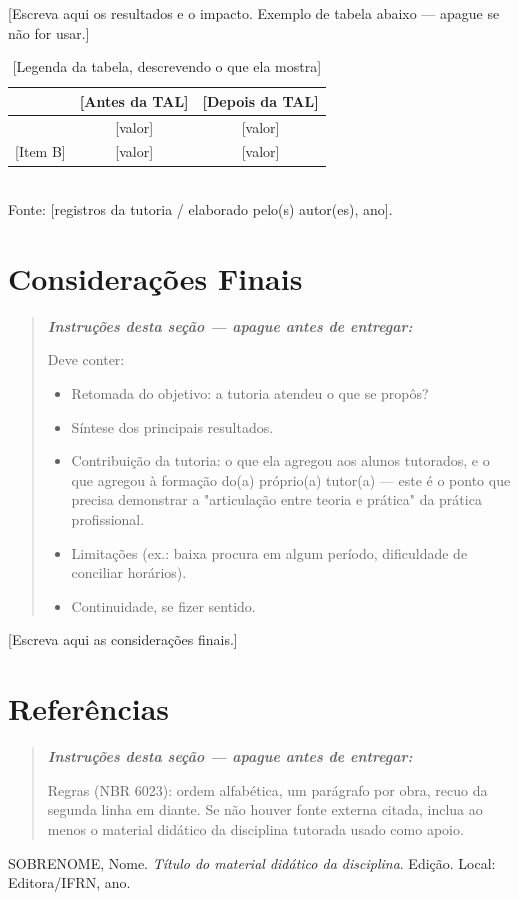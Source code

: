 \documentclass[article,12pt,a4paper]{abntex2}
\newenvironment{instrucoes}{%
  \begin{quotation}\footnotesize\itshape
  \noindent\textbf{\upshape Instruções desta seção — apague antes de entregar:}\par\smallskip
}{%
  \end{quotation}
}
\begin{document}
[Escreva aqui os resultados e o impacto. Exemplo de tabela abaixo — apague se não for usar.]

\begin{table}[!ht]
  \centering
  \caption{[Legenda da tabela, descrevendo o que ela mostra]}
  \begin{tabular}{lcc}
    \hline
    [Indicador] & [Antes da TAL] & [Depois da TAL] \\
    \hline
    [Item A] & [valor] & [valor] \\{}
    [Item B] & [valor] & [valor] \\
    \hline
  \end{tabular}
  \\[0.3em]
  {\footnotesize Fonte: [registros da tutoria / elaborado pelo(s) autor(es), ano].}
\end{table}

\section{Considerações Finais}

\begin{instrucoes}
Deve conter:
\begin{itemize}
  \item Retomada do objetivo: a tutoria atendeu o que se propôs?
  \item Síntese dos principais resultados.
  \item Contribuição da tutoria: o que ela agregou aos alunos tutorados, e o que agregou à formação do(a) próprio(a) tutor(a) — este é o ponto que precisa demonstrar a "articulação entre teoria e prática" da prática profissional.
  \item Limitações (ex.: baixa procura em algum período, dificuldade de conciliar horários).
  \item Continuidade, se fizer sentido.
\end{itemize}
\end{instrucoes}

[Escreva aqui as considerações finais.]

\postextual

\section*{Referências}

\begin{instrucoes}
Regras (NBR 6023): ordem alfabética, um parágrafo por obra, recuo da segunda linha em diante. Se não houver fonte externa citada, inclua ao menos o material didático da disciplina tutorada usado como apoio.
\end{instrucoes}

\newcommand{\referencia}[1]{\par\noindent\hangindent=1cm #1\par\medskip}

\referencia{SOBRENOME, Nome. \textit{Título do material didático da
disciplina}. Edição. Local: Editora/IFRN, ano.}
\end{document}
